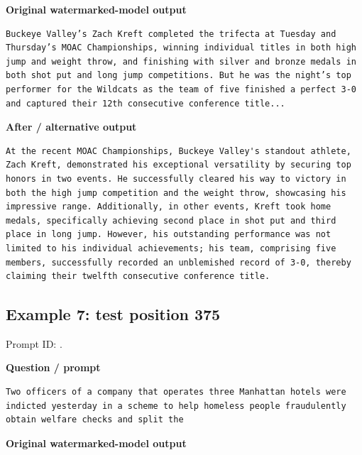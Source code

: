 \textbf{Original watermarked-model output}

\begin{Verbatim}
Buckeye Valley’s Zach Kreft completed the trifecta at Tuesday and Thursday’s MOAC Championships, winning individual titles in both high jump and weight throw, and finishing with silver and bronze medals in both shot put and long jump competitions. But he was the night’s top performer for the Wildcats as the team of five finished a perfect 3-0 and captured their 12th consecutive conference title...
\end{Verbatim}

\textbf{After / alternative output}

\begin{Verbatim}
At the recent MOAC Championships, Buckeye Valley's standout athlete, Zach Kreft, demonstrated his exceptional versatility by securing top honors in two events. He successfully cleared his way to victory in both the high jump competition and the weight throw, showcasing his impressive range. Additionally, in other events, Kreft took home medals, specifically achieving second place in shot put and third place in long jump. However, his outstanding performance was not limited to his individual achievements; his team, comprising five members, successfully recorded an unblemished record of 3-0, thereby claiming their twelfth consecutive conference title.
\end{Verbatim}

\subsection{Example 7: test position
375}\label{record-docs-watermarking-qualitative-paper-kgw-bira-md-example-7-test-position-375}

Prompt ID:
\texttt{}.

\textbf{Question / prompt}

\begin{Verbatim}
Two officers of a company that operates three Manhattan hotels were indicted yesterday in a scheme to help homeless people fraudulently obtain welfare checks and split the
\end{Verbatim}

\textbf{Original watermarked-model output}

